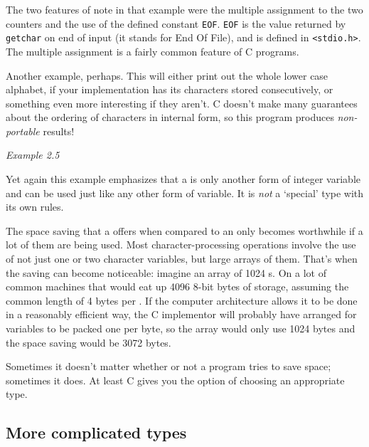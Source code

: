    The two features of note in that example were the multiple assignment to
    the two counters and the use of the defined constant \texttt{EOF}.
    \texttt{EOF} is the value returned by \texttt{getchar} on end of
    input (it stands for End Of File), and is defined in
    \texttt{<stdio.h>}. The multiple assignment is a fairly common
    feature of C programs.


   Another example, perhaps. This will either print out the whole lower
    case alphabet, if your implementation has its characters stored
    consecutively, or something even more interesting if they aren't.
    C doesn't make many guarantees about the ordering of characters in
    internal form, so this program produces \textit{non-portable} results!


    \begin{center}\textit{Example 2.5}\end{center}


   Yet again this example emphasizes that a \kchar{} is only
    another form of integer variable and can be used just like any other form
    of variable. It is \textit{not} a `special' type with its own
    rules.


   The space saving that a \kchar{} offers when compared to an
    \kint{} only becomes worthwhile if a lot of them are being used.
    Most character-processing operations involve the use of not just one or
    two character variables, but large arrays of them. That's when the saving
    can become noticeable: imagine an array of 1024 \kint{}s. On
    a lot of common machines that would eat up 4096 8-bit bytes of
    storage, assuming the common length of 4 bytes per \kint.
    If the computer architecture allows it to be done in a reasonably
    efficient way, the C implementor will probably have arranged for
    \kchar{} variables to be packed one per byte, so the array would
    only use 1024 bytes and the space saving would be
    3072 bytes.


   Sometimes it doesn't matter whether or not a program tries to save
    space; sometimes it does. At least C gives you the option of choosing an
    appropriate type.


  

  \subsection{More complicated types}
   

